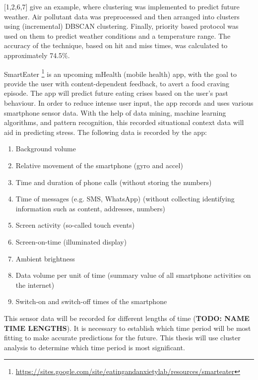 \textcite{convexhullDbscan}[1,2,6,7] give an example, where clustering was implemented to predict future weather. Air pollutant data was preprocessed and then arranged into clusters using (incremental) DBSCAN clustering. Finally, priority based protocol was used on them to predict weather conditions and a temperature range. The accuracy of the technique, based on hit and miss times, was calculated to approximately 74.5\%.


SmartEater \footnote{\url{https://sites.google.com/site/eatingandanxietylab/resources/smarteater}} is an upcoming mHealth (mobile health) app, with the goal to provide the user with content-dependent feedback, to avert a food craving episode. The app will predict future eating crises based on the user's past behaviour. In order to reduce intense user input, the app records and uses various smartphone sensor data.  With the help of data mining, machine learning algorithms, and pattern recognition, this recorded situational context data will aid in predicting stress. The following data is recorded by the app:

\begin{enumerate}
	\item Background volume
	\item Relative movement of the smartphone (gyro and accel)
	\item Time and duration of phone calls (without storing the numbers)
	\item Time of messages (e.g. SMS, WhatsApp) (without collecting identifying information such as content, addresses, numbers)
	\item Screen activity (so-called touch events)
	\item Screen-on-time (illuminated display)
	\item Ambient brightness
	\item Data volume per unit of time (summary value of all smartphone activities on the internet)
	\item Switch-on and switch-off times of the smartphone
\end{enumerate}


This sensor data will be recorded for different lengths of time (\textbf{TODO: NAME TIME LENGTHS}). It is necessary to establish which time period will be most fitting to make accurate predictions for the future. This thesis will use cluster analysis to determine which time period is most significant.

